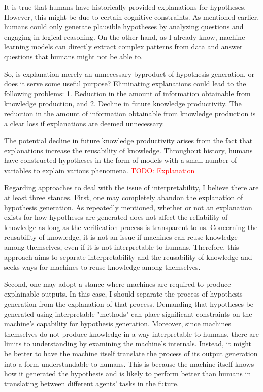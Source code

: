 \documentclass{article}
\begin{document}
It is true that humans have historically provided explanations for hypotheses. However, this might be due to certain cognitive constraints. As mentioned earlier, humans could only generate plausible hypotheses by analyzing questions and engaging in logical reasoning. On the other hand, as I already know, machine learning models can directly extract complex patterns from data and answer questions that humans might not be able to.

So, is explanation merely an unnecessary byproduct of hypothesis generation, or does it serve some useful purpose? Eliminating explanations could lead to the following problems: 1. Reduction in the amount of information obtainable from knowledge production, and 2. Decline in future knowledge productivity. The reduction in the amount of information obtainable from knowledge production is a clear loss if explanations are deemed unnecessary.

The potential decline in future knowledge productivity arises from the fact that explanations increase the reusability of knowledge. Throughout history, humans have constructed hypotheses in the form of models with a small number of variables to explain various phenomena. 
\textcolor{red}{TODO: Explanation}

Regarding approaches to deal with the issue of interpretability, I believe there are at least three stances. First, one may completely abandon the explanation of hypothesis generation. As repeatedly mentioned, whether or not an explanation exists for how hypotheses are generated does not affect the reliability of knowledge as long as the verification process is transparent to us. Concerning the reusability of knowledge, it is not an issue if machines can reuse knowledge among themselves, even if it is not interpretable to humans. Therefore, this approach aims to separate interpretability and the reusability of knowledge and seeks ways for machines to reuse knowledge among themselves.

Second, one may adopt a stance where machines are required to produce explainable outputs. In this case, I should separate the process of hypothesis generation from the explanation of that process. Demanding that hypotheses be generated using interpretable "methods" can place significant constraints on the machine's capability for hypothesis generation. Moreover, since machines themselves do not produce knowledge in a way interpretable to humans, there are limits to understanding by examining the machine's internals. Instead, it might be better to have the machine itself translate the process of its output generation into a form understandable to humans. This is because the machine itself knows how it generated the hypothesis and is likely to perform better than humans in translating between different agents' tasks in the future.
\end{document}
